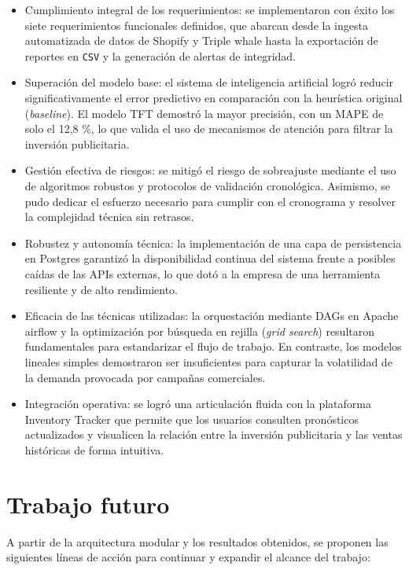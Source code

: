 \begin{itemize} 
	\item Cumplimiento integral de los requerimientos: se implementaron con éxito los siete requerimientos funcionales definidos, que abarcan desde la ingesta automatizada de datos de Shopify y Triple whale hasta la exportación de reportes en \texttt{CSV} y la generación de alertas de integridad.
	\item Superación del modelo base: el sistema de inteligencia artificial logró reducir significativamente el error predictivo en comparación con la heurística original (\textit{baseline}). El modelo TFT demostró la mayor precisión, con un MAPE de solo el 12,8 \%, lo que valida el uso de mecanismos de atención para filtrar la inversión publicitaria.
	\item Gestión efectiva de riesgos: se mitigó el riesgo de sobreajuste mediante el uso de algoritmos robustos y protocolos de validación cronológica. Asimismo, se pudo dedicar el esfuerzo necesario para cumplir con el cronograma y resolver la complejidad técnica sin retrasos.
	\item Robustez y autonomía técnica: la implementación de una capa de persistencia en Postgres garantizó la disponibilidad continua del sistema frente a posibles caídas de las APIs externas, lo que dotó a la empresa de una herramienta resiliente y de alto rendimiento.
	\item Eficacia de las técnicas utilizadas: la orquestación mediante DAGs en Apache airflow y la optimización por búsqueda en rejilla (\textit{grid search}) resultaron fundamentales para estandarizar el flujo de trabajo. En contraste, los modelos lineales simples demostraron ser insuficientes para capturar la volatilidad de la demanda provocada por campañas comerciales. 
	\item Integración operativa: se logró una articulación fluida con la plataforma Inventory Tracker que permite que los usuarios consulten pronósticos actualizados y visualicen la relación entre la inversión publicitaria y las ventas históricas de forma intuitiva.
	
\end{itemize}

\section{Trabajo futuro}
A partir de la arquitectura modular y los resultados obtenidos, se proponen las siguientes líneas de acción para continuar y expandir el alcance del trabajo:

